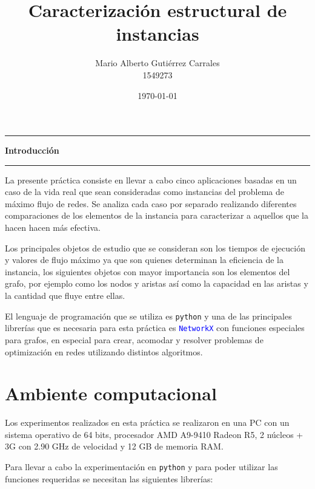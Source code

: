 \documentclass[12pt]{article}
\title{\textbf{Caracterización estructural de instancias}}
\author{Mario Alberto Gutiérrez Carrales \\ 1549273}
\date{\today}
\begin{document}
\maketitle

\setlength{\parskip}{10pt}
\setlength{\parindent}{0pt}
\setlength{\fboxrule}{1 pt}
\setlength{\fboxsep}{.1 cm}

\begin{center}\rule{1.0\textwidth}{0.1mm} \end{center}
\vspace{-1cm}
\begin{center} \Large{\textbf{Introducción}} \end{center}
\vspace{-1cm}
\begin{center}\rule{1.0\textwidth}{0.2mm} \end{center}

La presente práctica consiste en llevar a cabo cinco aplicaciones basadas en un caso de la vida real que sean consideradas como instancias del problema de máximo flujo de redes. Se analiza cada caso por separado realizando diferentes comparaciones de los elementos de la instancia para caracterizar a aquellos que la hacen hacen más efectiva. 

Los principales objetos de estudio que se consideran son los tiempos de ejecución y valores de flujo máximo ya que son quienes determinan la eficiencia de la instancia, los siguientes objetos con mayor importancia son los elementos del grafo, por ejemplo como los nodos y aristas así como la capacidad en las aristas y la cantidad que fluye entre ellas.

El lenguaje de programación que se utiliza es \texttt{python} \cite{Python} y una de las principales librerías que es necesaria para esta práctica es \textcolor{blue}{\texttt{NetworkX}} \cite{Net} con funciones especiales para grafos, en especial para crear, acomodar y resolver problemas de optimización en redes utilizando distintos algoritmos.

\newpage
\section{Ambiente computacional}

Los experimentos realizados en esta práctica se realizaron en una PC con un sistema operativo de 64 bits, procesador AMD A9-9410 Radeon R5, 2 núcleos + 3G con 2.90 GHz de velocidad y 12 GB de memoria RAM.

Para llevar a cabo la experimentación en \texttt{python}  y para poder utilizar las funciones requeridas se necesitan las siguientes librerías:
\end{document}
